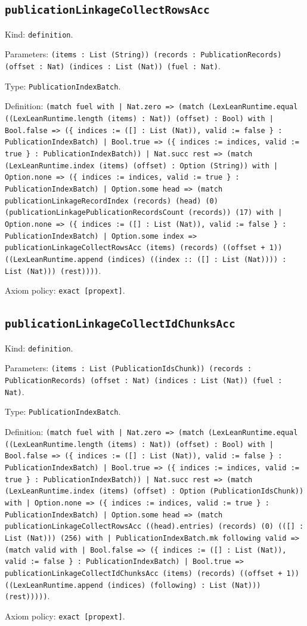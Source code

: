 \documentclass[11pt]{article}
\begin{document}
\subsection*{\texttt{publicationLinkageCollectRowsAcc}}
\noindent Kind: \texttt{definition}.\par
\noindent Parameters: \texttt{(items : List (String)) (records : PublicationRecords) (offset : Nat) (indices : List (Nat)) (fuel : Nat)}.\par
\noindent Type: \texttt{PublicationIndexBatch}.\par
\noindent Definition: \texttt{(match fuel with | Nat.zero => (match (LexLeanRuntime.equal ((LexLeanRuntime.length (items) : Nat)) (offset) : Bool) with | Bool.false => (\{ indices := ([] : List (Nat)), valid := false \} : PublicationIndexBatch) | Bool.true => (\{ indices := indices, valid := true \} : PublicationIndexBatch)) | Nat.succ rest => (match (LexLeanRuntime.index (items) (offset) : Option (String)) with | Option.none => (\{ indices := indices, valid := true \} : PublicationIndexBatch) | Option.some head => (match publicationLinkageRecordIndex (records) (head) (0) (publicationLinkagePublicationRecordsCount (records)) (17) with | Option.none => (\{ indices := ([] : List (Nat)), valid := false \} : PublicationIndexBatch) | Option.some index => publicationLinkageCollectRowsAcc (items) (records) ((offset + 1)) ((LexLeanRuntime.append (indices) ((index :: ([] : List (Nat)))) : List (Nat))) (rest))))}.\par
\noindent Axiom policy: \texttt{exact [propext]}.\par
\subsection*{\texttt{publicationLinkageCollectIdChunksAcc}}
\noindent Kind: \texttt{definition}.\par
\noindent Parameters: \texttt{(items : List (PublicationIdsChunk)) (records : PublicationRecords) (offset : Nat) (indices : List (Nat)) (fuel : Nat)}.\par
\noindent Type: \texttt{PublicationIndexBatch}.\par
\noindent Definition: \texttt{(match fuel with | Nat.zero => (match (LexLeanRuntime.equal ((LexLeanRuntime.length (items) : Nat)) (offset) : Bool) with | Bool.false => (\{ indices := ([] : List (Nat)), valid := false \} : PublicationIndexBatch) | Bool.true => (\{ indices := indices, valid := true \} : PublicationIndexBatch)) | Nat.succ rest => (match (LexLeanRuntime.index (items) (offset) : Option (PublicationIdsChunk)) with | Option.none => (\{ indices := indices, valid := true \} : PublicationIndexBatch) | Option.some head => (match publicationLinkageCollectRowsAcc ((head).entries) (records) (0) (([] : List (Nat))) (256) with | PublicationIndexBatch.mk following valid => (match valid with | Bool.false => (\{ indices := ([] : List (Nat)), valid := false \} : PublicationIndexBatch) | Bool.true => publicationLinkageCollectIdChunksAcc (items) (records) ((offset + 1)) ((LexLeanRuntime.append (indices) (following) : List (Nat))) (rest)))))}.\par
\noindent Axiom policy: \texttt{exact [propext]}.\par
\end{document}
